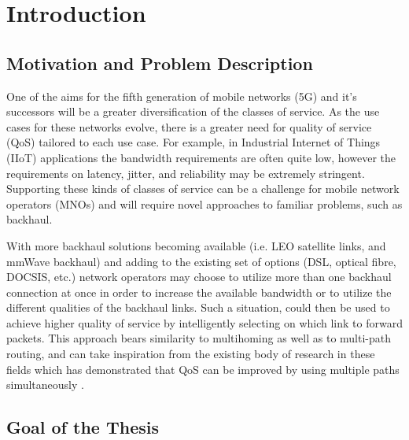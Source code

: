 
\cleardoublepage
\chapter{Introduction}
\label{cha:introduction}

\section{Motivation and Problem Description}
\label{sec:motivation}

One of the aims for the fifth generation of mobile networks (5G) and it's successors will be a greater diversification of the classes of service. As the use cases for these networks evolve, there is a greater need for quality of service (QoS) tailored to each use case. For example, in Industrial Internet of Things (IIoT) applications the bandwidth requirements are often quite low, however the requirements on latency, jitter, and reliability may be extremely stringent. Supporting these kinds of classes of service can be  a challenge for mobile network operators (MNOs) and will require novel approaches to familiar problems, such as backhaul.

With more backhaul solutions becoming available (i.e. LEO satellite links, and mmWave backhaul) and adding to the existing set of options (DSL, optical fibre, DOCSIS, etc.) network operators may choose to utilize more than one backhaul connection at once in order to increase the available bandwidth or to utilize the different qualities of the backhaul links. Such a situation, could then be used to achieve higher quality of service by intelligently selecting on which link to forward packets. This approach bears similarity to multihoming as well as to multi-path routing, and can take inspiration from the existing body of research in these fields which has demonstrated that QoS can be improved by using multiple paths simultaneously \cite{akella_measurement-based_nodate, shu_tao_improving_2005, habib_improving_2007, goldenberg_optimizing_nodate}.



\section{Goal of the Thesis}
\label{sec:goal}

